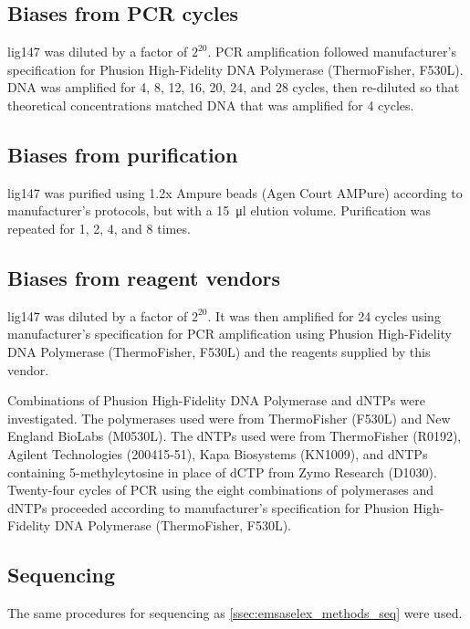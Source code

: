 \documentclass[parskip=full, numbers=noenddot]{scrreprt}
\begin{document}
\subsection{Biases from PCR cycles}
\label{ssec:pcrbias_methods_pcr}

lig147 was diluted by a factor of $2^{20}$.  PCR amplification followed manufacturer's specification for Phusion High-Fidelity DNA Polymerase (ThermoFisher, F530L).  DNA was amplified for 4, 8, 12, 16, 20, 24, and 28 cycles, then re-diluted so that theoretical concentrations matched DNA that was amplified for 4 cycles.

\subsection{Biases from purification}
\label{ssec:pcrbias_methods_pur}

lig147 was purified using 1.2x Ampure beads (Agen Court AMPure) according to manufacturer's protocols, but with a \SI{15}{\micro\litre} elution volume.  Purification was repeated for 1, 2, 4, and 8 times.

\subsection{Biases from reagent vendors}
\label{ssec:pcrbias_methods_reagent}

lig147 was diluted by a factor of $2^{20}$.  It was then amplified for 24 cycles using manufacturer's specification for PCR amplification using Phusion High-Fidelity DNA Polymerase (ThermoFisher, F530L) and the reagents supplied by this vendor.

Combinations of Phusion High-Fidelity DNA Polymerase and dNTPs were investigated.  The polymerases used were from ThermoFisher (F530L) and New England BioLabs (M0530L).  The dNTPs used were from ThermoFisher (R0192), Agilent Technologies (200415-51), Kapa Biosystems (KN1009), and dNTPs containing 5-methylcytosine in place of dCTP from Zymo Research (D1030).  Twenty-four cycles of PCR using the eight combinations of polymerases and dNTPs proceeded according to manufacturer's specification for Phusion High-Fidelity DNA Polymerase (ThermoFisher, F530L).

\subsection{Sequencing}
\label{ssec:pcrbias_methods_seq}

The same procedures for sequencing as \ref{ssec:emsaselex_methods_seq} were used.
\end{document}
